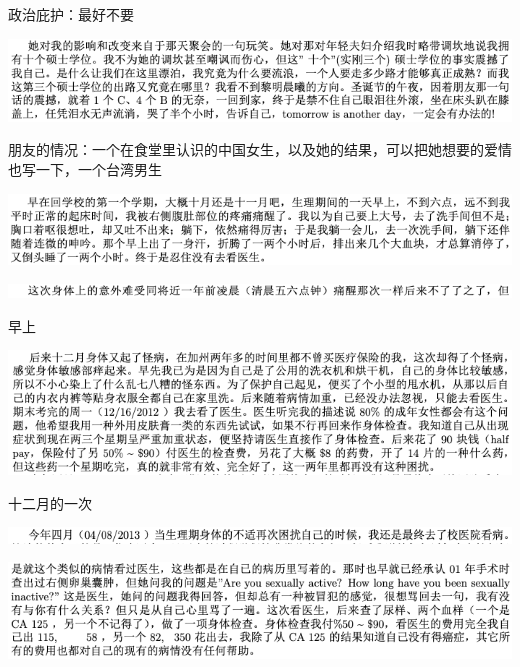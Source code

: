 \documentclass[9pt, b5paper]{article}
\begin{document}
政治庇护：最好不要

\begin{center}
\includegraphics[width=.9\linewidth]{./pic/backups_plans_20210424_210639.png}
\end{center}

朋友的情况：一个在食堂里认识的中国女生，以及她的结果，可以把她想要的爱情也写一下，一个台湾男生

\begin{center}
\includegraphics[width=.9\linewidth]{./pic/backups_plans_20210424_212545.png}
\end{center}

\begin{center}
\includegraphics[width=.9\linewidth]{./pic/backups_plans_20210424_220817.png}
\end{center}

早上

\begin{center}
\includegraphics[width=.9\linewidth]{./pic/backups_plans_20210424_212910.png}
\end{center}

十二月的一次

\begin{center}
\includegraphics[width=.9\linewidth]{./pic/backups_plans_20210424_213118.png}
\end{center}

\begin{center}
\includegraphics[width=.9\linewidth]{./pic/backups_plans_20210424_213150.png}
\end{center}
\end{document}
